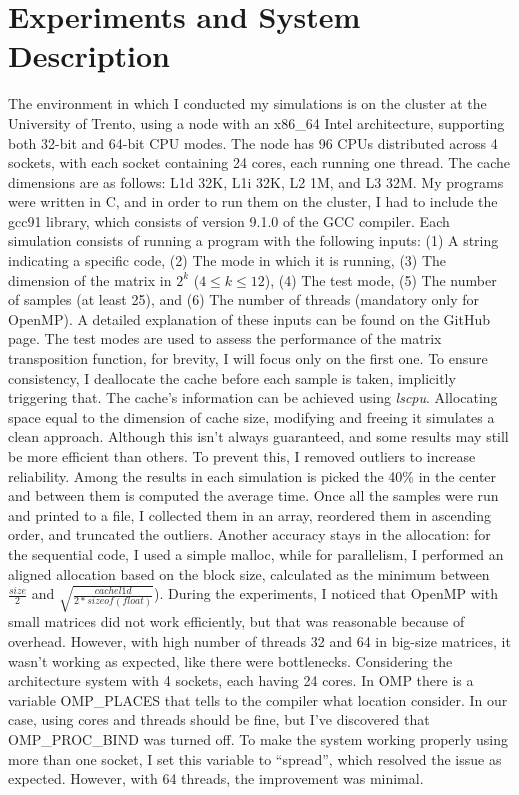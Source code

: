 \section{Experiments and System Description}
The environment in which I conducted my simulations is on the cluster at the University of Trento, using a node with an x86\_64 Intel architecture, supporting both 32-bit and 64-bit CPU modes. The node has 96 CPUs distributed across 4 sockets, with each socket containing 24 cores, each running one thread. The cache dimensions are as follows: L1d 32K, L1i 32K, L2 1M, and L3 32M. My programs were written in C, and in order to run them on the cluster, I had to include the gcc91 library, which consists of version 9.1.0 of the GCC compiler. Each simulation consists of running a program with the following inputs: (1) A string indicating a specific code, (2) The mode in which it is running, (3) The dimension of the matrix in $2^k$ ($4 \leq k \leq 12$), (4) The test mode, (5) The number of samples (at least 25), and (6) The number of threads (mandatory only for OpenMP). A detailed explanation of these inputs can be found on the GitHub page. The test modes are used to assess the performance of the matrix transposition function, for brevity, I will focus only on the first one. To ensure consistency, I deallocate the cache before each sample is taken, implicitly triggering that. The cache’s information can be achieved using \textit{lscpu}. Allocating space equal to the dimension of cache size, modifying and freeing it simulates a clean approach. Although this isn't always guaranteed, and some results may still be more efficient than others. To prevent this, I removed outliers to increase reliability. Among the results in each simulation is picked the 40\% in the center and between them is computed the average time. Once all the samples were run and printed to a file, I collected them in an array, reordered them in ascending order, and truncated the outliers. Another accuracy stays in the allocation: for the sequential code, I used a simple malloc, while for parallelism, I performed an aligned allocation based on the block size, calculated as the minimum between $\frac{size}{2}$ and $\sqrt{\frac{cachel1d}{2*sizeof(float)}}$). During the experiments, I noticed that OpenMP with small matrices did not work efficiently, but that was reasonable because of overhead. However, with high number of threads 32 and 64 in big-size matrices, it wasn't working as expected, like there were bottlenecks. Considering the architecture system with 4 sockets, each having 24 cores. In OMP there is a variable OMP\_PLACES that tells to the compiler what location consider. In our case, using cores and threads should be fine, but I've discovered that OMP\_PROC\_BIND was turned off. To make the system working properly using more than one socket, I set this variable to “spread”, which resolved the issue as expected. However, with 64 threads, the improvement was minimal.
